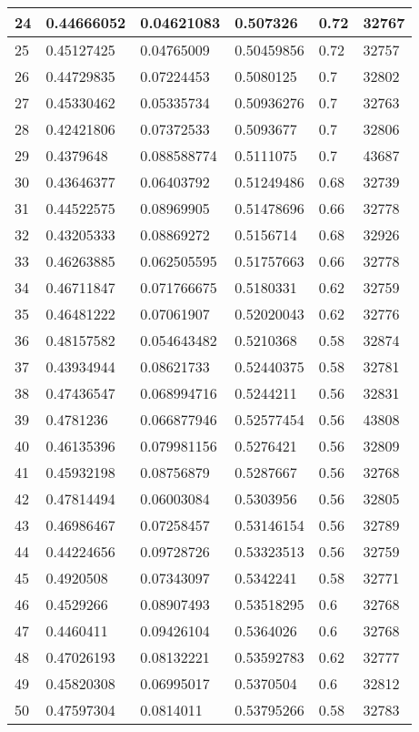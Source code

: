 \begin{longtable}{|l|l|l|l|l|l|}
24 & 0.44666052 & 0.04621083 & 0.507326 & 0.72 & 32767 \\ \hline 
25 & 0.45127425 & 0.04765009 & 0.50459856 & 0.72 & 32757 \\ \hline 
26 & 0.44729835 & 0.07224453 & 0.5080125 & 0.7 & 32802 \\ \hline 
27 & 0.45330462 & 0.05335734 & 0.50936276 & 0.7 & 32763 \\ \hline 
28 & 0.42421806 & 0.07372533 & 0.5093677 & 0.7 & 32806 \\ \hline 
29 & 0.4379648 & 0.088588774 & 0.5111075 & 0.7 & 43687 \\ \hline 
30 & 0.43646377 & 0.06403792 & 0.51249486 & 0.68 & 32739 \\ \hline 
31 & 0.44522575 & 0.08969905 & 0.51478696 & 0.66 & 32778 \\ \hline 
32 & 0.43205333 & 0.08869272 & 0.5156714 & 0.68 & 32926 \\ \hline 
33 & 0.46263885 & 0.062505595 & 0.51757663 & 0.66 & 32778 \\ \hline 
34 & 0.46711847 & 0.071766675 & 0.5180331 & 0.62 & 32759 \\ \hline 
35 & 0.46481222 & 0.07061907 & 0.52020043 & 0.62 & 32776 \\ \hline 
36 & 0.48157582 & 0.054643482 & 0.5210368 & 0.58 & 32874 \\ \hline 
37 & 0.43934944 & 0.08621733 & 0.52440375 & 0.58 & 32781 \\ \hline 
38 & 0.47436547 & 0.068994716 & 0.5244211 & 0.56 & 32831 \\ \hline 
39 & 0.4781236 & 0.066877946 & 0.52577454 & 0.56 & 43808 \\ \hline 
40 & 0.46135396 & 0.079981156 & 0.5276421 & 0.56 & 32809 \\ \hline 
41 & 0.45932198 & 0.08756879 & 0.5287667 & 0.56 & 32768 \\ \hline 
42 & 0.47814494 & 0.06003084 & 0.5303956 & 0.56 & 32805 \\ \hline 
43 & 0.46986467 & 0.07258457 & 0.53146154 & 0.56 & 32789 \\ \hline 
44 & 0.44224656 & 0.09728726 & 0.53323513 & 0.56 & 32759 \\ \hline 
45 & 0.4920508 & 0.07343097 & 0.5342241 & 0.58 & 32771 \\ \hline 
46 & 0.4529266 & 0.08907493 & 0.53518295 & 0.6 & 32768 \\ \hline 
47 & 0.4460411 & 0.09426104 & 0.5364026 & 0.6 & 32768 \\ \hline 
48 & 0.47026193 & 0.08132221 & 0.53592783 & 0.62 & 32777 \\ \hline 
49 & 0.45820308 & 0.06995017 & 0.5370504 & 0.6 & 32812 \\ \hline 
50 & 0.47597304 & 0.0814011 & 0.53795266 & 0.58 & 32783 \\ \hline 
\end{longtable}